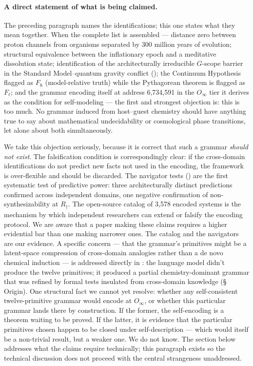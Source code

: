 \documentclass[12pt,a4paper]{article}
\newcommand{\Oinf}{O_\infty}
\begin{document}
\paragraph{A direct statement of what is being claimed.}
\label{par:directclaim}
The preceding paragraph names the identifications; this one states
what they mean together. When the complete list is assembled ---
distance zero between proton channels from organisms separated by
300 million years of evolution; structural equivalence between the
inflationary epoch and a meditative dissolution state; identification
of the architecturally irreducible $G$-scope barrier in the Standard Model--quantum
gravity conflict (); the Continuum Hypothesis flagged as $F_\hbar$
(model-relative truth) while the Pythagorean theorem is flagged as
$F_\ell$; and the grammar encoding itself at address 6,734,591 in
the $\Oinf$ tier it derives as the condition for self-modeling ---
the first and strongest objection is: this is too much. No grammar
induced from host--guest chemistry should have anything true to say
about mathematical undecidability or cosmological phase transitions,
let alone about both simultaneously.

We take this objection seriously, because it is correct that such a
grammar \emph{should not exist}. The falsification condition is
correspondingly clear: if the cross-domain identifications do not
predict new facts not used in the encoding, the framework is
over-flexible and should be discarded. The navigator tests
() are the first systematic test of
predictive power: three architecturally distinct predictions
confirmed across independent domains, one negative confirmation
of non-synthesizability at $R_\dagger$. The open-source catalog of
3,578 encoded systems is the mechanism by which independent
researchers can extend or falsify the encoding protocol. We are aware that a paper making these claims requires a higher
evidential bar than one making narrower ones. The catalog and the
navigators are our evidence. A specific concern --- that the grammar's
primitives might be a latent-space compression of cross-domain analogies
rather than a de novo chemical induction --- is addressed directly in
: the language model didn't produce the twelve
primitives; it produced a partial chemistry-dominant grammar that was
refined by formal tests insulated from cross-domain knowledge
(\S\,Origin). One structural fact we cannot yet resolve: whether any self-consistent twelve-primitive grammar would
encode at $\Oinf$, or whether this particular grammar lands there
by construction. If the former, the self-encoding is a theorem
waiting to be proved. If the latter, it is evidence that the
particular primitives chosen happen to be closed under self-description
--- which would itself be a non-trivial result, but a weaker one.
We do not know. The section below addresses what the claims require
technically; this paragraph exists so the technical discussion does
not proceed with the central strangeness unaddressed.
\end{document}
